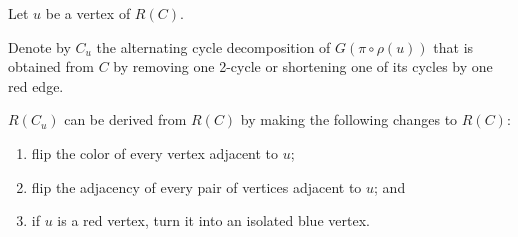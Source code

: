 \documentclass{beamer}
\theoremstyle{definition}
\begin{document}
\begin{frame}

Let $u$ be a vertex of $R(C)$.\pause

\begin{definition}
Denote by $C_u$ the alternating cycle decomposition of $G(\pi \circ \rho(u))$ that is obtained from $C$ by removing one 2-cycle or shortening one of its cycles by one red edge.
\end{definition}\pause

\begin{lemma}
\label{lem:5}
$R(C_u)$ can be derived from $R(C)$ by making the following changes to $R(C)$:\pause
\begin{enumerate}
    \item flip the color of every vertex adjacent to $u$\pause;
    \item flip the adjacency of every pair of vertices adjacent to $u$\pause; and
    \item if $u$ is a red vertex, turn it into an isolated blue vertex.
\end{enumerate}
\end{lemma}

\end{frame}
\end{document}
